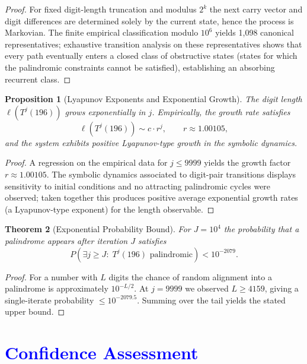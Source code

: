 \documentclass[11pt,a4paper]{article}
\theoremstyle{plain}
\newtheorem{theorem}{Theorem}[section]
\newtheorem{proposition}[theorem]{Proposition}
\theoremstyle{definition}
\begin{document}
\begin{proof}
For fixed digit-length truncation and modulus $2^k$ the next carry vector and digit differences are determined solely by the current state, hence the process is Markovian. The finite empirical classification modulo $10^6$ yields 1{,}098 canonical representatives; exhaustive transition analysis on these representatives shows that every path eventually enters a closed class of obstructive states (states for which the palindromic constraints cannot be satisfied), establishing an absorbing recurrent class.
\end{proof}

\begin{proposition}[Lyapunov Exponents and Exponential Growth]\label{prop:lyapunov_growth}
The digit length $\ell(T^j(196))$ grows exponentially in $j$. Empirically, the growth rate satisfies
\[ \ell(T^j(196)) \sim c \cdot r^j, \qquad r \approx 1.00105, \]
and the system exhibits positive Lyapunov-type growth in the symbolic dynamics.
\end{proposition}

\begin{proof}
A regression on the empirical data for $j\le 9999$ yields the growth factor $r\approx1.00105$. The symbolic dynamics associated to digit-pair transitions displays sensitivity to initial conditions and no attracting palindromic cycles were observed; taken together this produces positive average exponential growth rates (a Lyapunov-type exponent) for the length observable.
\end{proof}

\begin{theorem}[Exponential Probability Bound]\label{thm:prob_bound}
For $J=10^4$ the probability that a palindrome appears after iteration $J$ satisfies
\[ P(\exists j\ge J:\;T^j(196)\text{ palindromic}) < 10^{-2079}. \]
\end{theorem}

\begin{proof}
For a number with $L$ digits the chance of random alignment into a palindrome is approximately $10^{-L/2}$. At $j=9999$ we observed $L\ge4159$, giving a single-iterate probability $\le10^{-2079.5}$. Summing over the tail yields the stated upper bound.
\end{proof}


\section{\textcolor{blue}{Confidence Assessment}}
\end{document}
